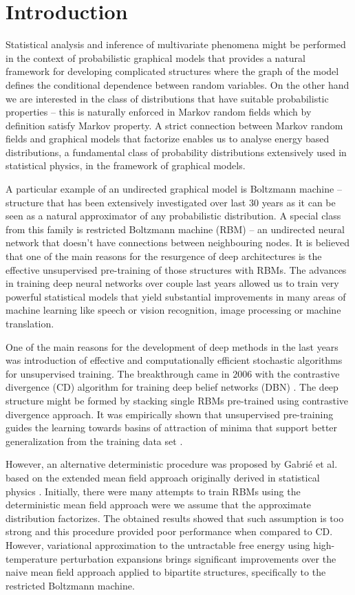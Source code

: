\chapter*{Introduction}
Statistical analysis and inference of multivariate phenomena might be performed in the context of probabilistic graphical models that provides a natural framework for developing complicated structures where the graph of the model defines the conditional dependence between random variables. On the other hand we are interested in the class of distributions that have suitable probabilistic properties -- this is naturally enforced in Markov random fields which by definition satisfy Markov property. A strict connection between Markov random fields and graphical models that factorize enables us to analyse energy based distributions, a fundamental class of probability distributions extensively used in statistical physics, in the framework of graphical models.

A particular example of an undirected graphical model is Boltzmann machine -- structure that has been extensively investigated over last $30$ years as it can be seen as a natural approximator of any probabilistic distribution. A special class from this family is restricted Boltzmann machine (RBM) -- an undirected neural network that doesn't have connections between neighbouring nodes. It is believed that one of the main reasons for the resurgence of deep architectures is the effective unsupervised pre-training of those structures with RBMs. The advances in training deep neural networks over couple last years allowed us to train very powerful statistical models that yield substantial improvements in many areas of machine learning like speech or vision recognition, image processing or machine translation. 

One of the main reasons for the development of deep methods in the last years was introduction of effective and computationally efficient stochastic algorithms for unsupervised training. The breakthrough came in $2006$ with the contrastive divergence (CD) algorithm for training deep belief networks (DBN) \cite{hinton2006reducing}. The deep structure might be formed by stacking single RBMs pre-trained using contrastive divergence approach. It was empirically shown that unsupervised pre-training guides the learning towards basins of attraction of minima that support better generalization from the training data set \cite{erhan2010does}. 

However, an alternative deterministic procedure was proposed by Gabri{\'e} et al. \cite{gabrie2015training} based on the extended mean field approach originally derived in statistical physics \cite{yedidia2001idiosyncratic}. Initially, there were many attempts to train RBMs using the deterministic mean field approach were we assume that the approximate distribution factorizes. The obtained results showed that such assumption is too strong and this procedure provided poor performance when compared to CD. However, variational approximation to the untractable free energy using high-temperature perturbation expansions brings significant improvements over the naive mean field approach applied to bipartite structures, specifically to the restricted Boltzmann machine. 

